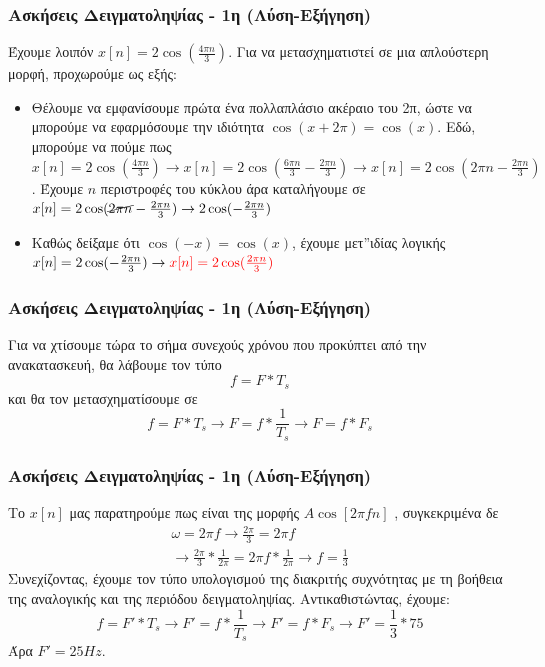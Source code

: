 \documentclass{beamer}
\begin{document}
\begin{frame}
	\frametitle{Ασκήσεις Δειγματοληψίας - 1η (Λύση-Εξήγηση)}
		Έχουμε λοιπόν $x[n] = 2\cos(\frac{4\pi n}{3})$. Για να μετασχηματιστεί σε μια απλούστερη μορφή, προχωρούμε ως εξής:
		\begin{itemize}
			\item Θέλουμε να εμφανίσουμε πρώτα ένα πολλαπλάσιο ακέραιο του 2π, ώστε να μπορούμε να εφαρμόσουμε την ιδιότητα $\cos(x+2\pi) = \cos(x)$. Εδώ, μπορούμε να πούμε πως $x[n] = 2\cos(\frac{4\pi n}{3}) \rightarrow x[n] = 2\cos(\frac{6\pi n}{3} - \frac{2\pi n}{3}) \rightarrow x[n] = 2\cos(2\pi n - \frac{2\pi n}{3}) $. Έχουμε $n$ περιστροφές του κύκλου άρα καταλήγουμε σε $x[n] = 2\cos(\cancel{2\pi n} - \frac{2\pi n}{3}) \rightarrow 2\cos(- \frac{2\pi n}{3})$
			\pause
			\item Καθώς δείξαμε ότι $\cos(-x) = \cos(x)$, έχουμε μετ''ιδίας λογικής $x[n] = 2\cos(- \frac{2\pi n}{3}) \rightarrow \text{\textcolor{red}{$x[n] = 2\cos(\frac{2\pi n}{3})$}} $
		\end{itemize}
\end{frame}

\begin{frame}
	\frametitle{Ασκήσεις Δειγματοληψίας - 1η (Λύση-Εξήγηση)}
	Για να χτίσουμε τώρα το σήμα συνεχούς χρόνου που προκύπτει από την ανακατασκευή, θα λάβουμε τον τύπο
	\begin{equation*}
		f = F * T_s
	\end{equation*}
	και θα τον μετασχηματίσουμε σε
	\begin{equation*}
		f = F * T_s \rightarrow F = f * \frac{1}{T_s} \rightarrow F = f*F_s
	\end{equation*}

\end{frame}

\begin{frame}
	\frametitle{Ασκήσεις Δειγματοληψίας - 1η (Λύση-Εξήγηση)}
	Το $x[n]$ μας παρατηρούμε πως είναι της μορφής $A\cos[2\pi f n]$ , συγκεκριμένα δε
	\begin{align*}
		\omega = 2\pi f \rightarrow \frac{2\pi}{3} = 2\pi f \\ 
		\rightarrow  \frac{2\pi}{3} * \frac{1}{2\pi} = 2\pi f * \frac{1}{2\pi} \rightarrow f = \frac{1}{3}
	\end{align*} 
	Συνεχίζοντας, έχουμε τον τύπο υπολογισμού της διακριτής συχνότητας με τη βοήθεια της αναλογικής και της περιόδου δειγματοληψίας. Αντικαθιστώντας, έχουμε:
	\begin{equation*}
		f = F' * T_s \rightarrow F' = f * \frac{1}{T_s} \rightarrow F' = f*F_s \rightarrow F' = \frac{1}{3} * 75
	\end{equation*}
	Άρα $F' = 25 Hz$.
	
\end{frame}
\end{document}
